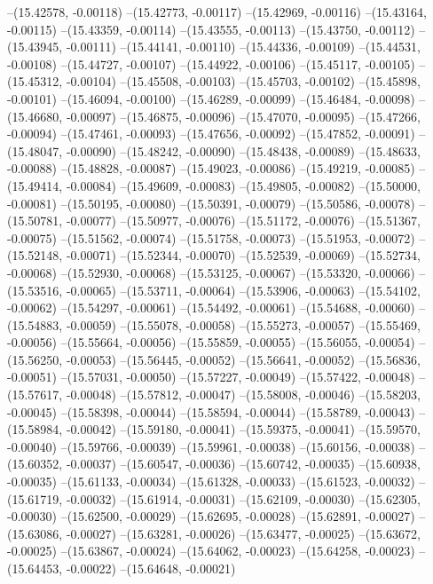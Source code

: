 --(15.42578, -0.00118)
--(15.42773, -0.00117)
--(15.42969, -0.00116)
--(15.43164, -0.00115)
--(15.43359, -0.00114)
--(15.43555, -0.00113)
--(15.43750, -0.00112)
--(15.43945, -0.00111)
--(15.44141, -0.00110)
--(15.44336, -0.00109)
--(15.44531, -0.00108)
--(15.44727, -0.00107)
--(15.44922, -0.00106)
--(15.45117, -0.00105)
--(15.45312, -0.00104)
--(15.45508, -0.00103)
--(15.45703, -0.00102)
--(15.45898, -0.00101)
--(15.46094, -0.00100)
--(15.46289, -0.00099)
--(15.46484, -0.00098)
--(15.46680, -0.00097)
--(15.46875, -0.00096)
--(15.47070, -0.00095)
--(15.47266, -0.00094)
--(15.47461, -0.00093)
--(15.47656, -0.00092)
--(15.47852, -0.00091)
--(15.48047, -0.00090)
--(15.48242, -0.00090)
--(15.48438, -0.00089)
--(15.48633, -0.00088)
--(15.48828, -0.00087)
--(15.49023, -0.00086)
--(15.49219, -0.00085)
--(15.49414, -0.00084)
--(15.49609, -0.00083)
--(15.49805, -0.00082)
--(15.50000, -0.00081)
--(15.50195, -0.00080)
--(15.50391, -0.00079)
--(15.50586, -0.00078)
--(15.50781, -0.00077)
--(15.50977, -0.00076)
--(15.51172, -0.00076)
--(15.51367, -0.00075)
--(15.51562, -0.00074)
--(15.51758, -0.00073)
--(15.51953, -0.00072)
--(15.52148, -0.00071)
--(15.52344, -0.00070)
--(15.52539, -0.00069)
--(15.52734, -0.00068)
--(15.52930, -0.00068)
--(15.53125, -0.00067)
--(15.53320, -0.00066)
--(15.53516, -0.00065)
--(15.53711, -0.00064)
--(15.53906, -0.00063)
--(15.54102, -0.00062)
--(15.54297, -0.00061)
--(15.54492, -0.00061)
--(15.54688, -0.00060)
--(15.54883, -0.00059)
--(15.55078, -0.00058)
--(15.55273, -0.00057)
--(15.55469, -0.00056)
--(15.55664, -0.00056)
--(15.55859, -0.00055)
--(15.56055, -0.00054)
--(15.56250, -0.00053)
--(15.56445, -0.00052)
--(15.56641, -0.00052)
--(15.56836, -0.00051)
--(15.57031, -0.00050)
--(15.57227, -0.00049)
--(15.57422, -0.00048)
--(15.57617, -0.00048)
--(15.57812, -0.00047)
--(15.58008, -0.00046)
--(15.58203, -0.00045)
--(15.58398, -0.00044)
--(15.58594, -0.00044)
--(15.58789, -0.00043)
--(15.58984, -0.00042)
--(15.59180, -0.00041)
--(15.59375, -0.00041)
--(15.59570, -0.00040)
--(15.59766, -0.00039)
--(15.59961, -0.00038)
--(15.60156, -0.00038)
--(15.60352, -0.00037)
--(15.60547, -0.00036)
--(15.60742, -0.00035)
--(15.60938, -0.00035)
--(15.61133, -0.00034)
--(15.61328, -0.00033)
--(15.61523, -0.00032)
--(15.61719, -0.00032)
--(15.61914, -0.00031)
--(15.62109, -0.00030)
--(15.62305, -0.00030)
--(15.62500, -0.00029)
--(15.62695, -0.00028)
--(15.62891, -0.00027)
--(15.63086, -0.00027)
--(15.63281, -0.00026)
--(15.63477, -0.00025)
--(15.63672, -0.00025)
--(15.63867, -0.00024)
--(15.64062, -0.00023)
--(15.64258, -0.00023)
--(15.64453, -0.00022)
--(15.64648, -0.00021)
